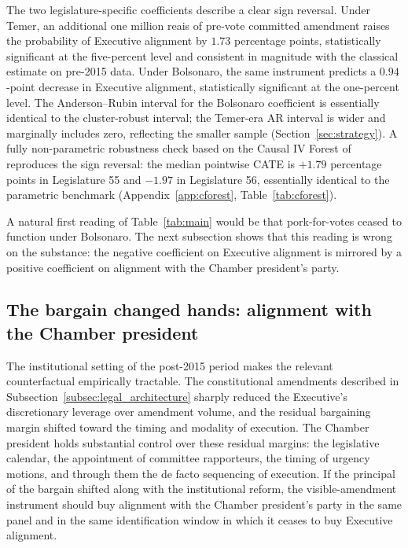 \documentclass[preprint,12pt,authoryear]{elsarticle}
\begin{document}
The two legislature-specific coefficients describe a clear sign reversal. Under Temer, an additional one million reais of pre-vote committed amendment raises the probability of Executive alignment by $1.73$ percentage points, statistically significant at the five-percent level and consistent in magnitude with the classical \citet{PereiraAndMueller2004} estimate on pre-2015 data. Under Bolsonaro, the same instrument predicts a $0.94$-point decrease in Executive alignment, statistically significant at the one-percent level. The Anderson--Rubin interval for the Bolsonaro coefficient is essentially identical to the cluster-robust interval; the Temer-era AR interval is wider and marginally includes zero, reflecting the smaller sample (Section~\ref{sec:strategy}). A fully non-parametric robustness check based on the Causal IV Forest of \citet{AtheyTibshiraniWager2019} reproduces the sign reversal: the median pointwise CATE is $+1.79$ percentage points in Legislature 55 and $-1.97$ in Legislature 56, essentially identical to the parametric benchmark (Appendix~\ref{app:cforest}, Table~\ref{tab:cforest}).

A natural first reading of Table~\ref{tab:main} would be that pork-for-votes ceased to function under Bolsonaro. The next subsection shows that this reading is wrong on the substance: the negative coefficient on Executive alignment is mirrored by a positive coefficient on alignment with the Chamber president's party.

\subsection{The bargain changed hands: alignment with the Chamber president}
\label{subsec:legislative_capture}

The institutional setting of the post-2015 period makes the relevant counterfactual empirically tractable. The constitutional amendments described in Subsection~\ref{subsec:legal_architecture} sharply reduced the Executive's discretionary leverage over amendment volume, and the residual bargaining margin shifted toward the timing and modality of execution. The Chamber president holds substantial control over these residual margins: the legislative calendar, the appointment of committee rapporteurs, the timing of urgency motions, and through them the de facto sequencing of execution. If the principal of the bargain shifted along with the institutional reform, the visible-amendment instrument should buy alignment with the Chamber president's party in the same panel and in the same identification window in which it ceases to buy Executive alignment.
\end{document}
